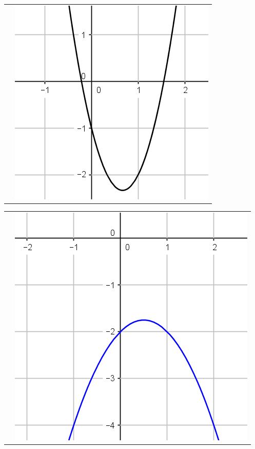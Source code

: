 \documentclass[12pt,a4paper]{article}
\begin{document}
\begin{tabular}{cc }
	 &
	
	\includegraphics[scale=0.25]{./img/fig_3}\\
\end{tabular}


\begin{tabular}{cc }
	 &
	
	\includegraphics[scale=0.25]{./img/fig_6}\\
\end{tabular}
\end{document}
